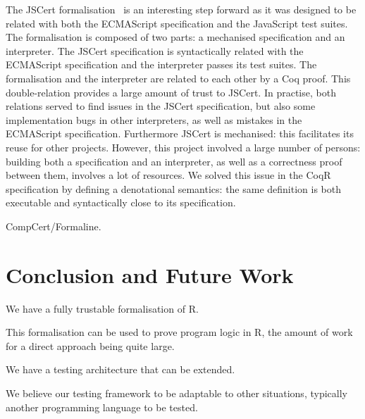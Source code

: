 \documentclass[
    sigplan,
    10pt,
    review, %
    natbib=false %
 ]{acmart}
\begin{document}
The JSCert formalisation~\parencite{jscert, popl14jscert}
is an interesting step forward as it was designed
to be related with both the ECMAScript specification and the JavaScript test suites.
The formalisation is composed of two parts:
a mechanised specification and an interpreter.
The JSCert specification is syntactically related with the ECMAScript specification
and the interpreter passes its test suites.
The formalisation and the interpreter are related to each other by a Coq proof.
This double-relation provides a large amount of trust to JSCert.
In practise, both relations served to find issues in the JSCert specification,
but also some implementation bugs in other interpreters,
as well as mistakes in the ECMAScript specification.
Furthermore JSCert is mechanised:
this facilitates its reuse for other projects.
However, this project involved a large number of persons:
building both a specification and an interpreter,
as well as a correctness proof between them, involves a lot of resources.
We solved this issue in the CoqR specification
by defining a denotational semantics:
the same definition is both executable and syntactically close to its specification.

CompCert/Formaline.

\section{Conclusion and Future Work}
\label{sec:conclusion}

We have a fully trustable formalisation of R.

This formalisation can be used to prove program logic in R,
the amount of work for a direct approach being quite large.

We have a testing architecture that can be extended.

We believe our testing framework to be adaptable to other situations,
typically another programming language to be tested.

\printbibliography{}
\end{document}
